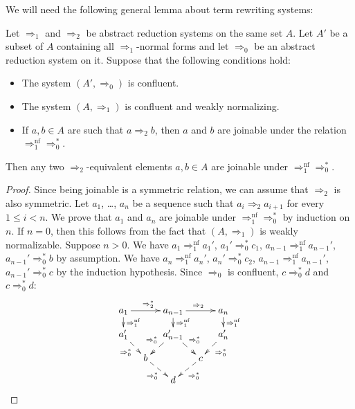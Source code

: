 \documentclass[reqno]{amsart}
\theoremstyle{definition}
\theoremstyle{remark}
\newcommand{\nf}{\mathrm{nf}}
\numberwithin{figure}{section}
\begin{document}
We will need the following general lemma about term rewriting systems:

\begin{lem}[conf-nf]
Let $\Rightarrow_1$ and $\Rightarrow_2$ be abstract reduction systems on the same set $A$.
Let $A'$ be a subset of $A$ containing all $\Rightarrow_1$-normal forms and let $\Rightarrow_0$ be an abstract reduction system on it.
Suppose that the following conditions hold:
\begin{itemize}
\item The system $(A',\Rightarrow_0)$ is confluent.
\item The system $(A,\Rightarrow_1)$ is confluent and weakly normalizing.
\item If $a,b \in A$ are such that $a \Rightarrow_2 b$, then $a$ and $b$ are joinable under the relation $\Rightarrow_1^\nf \Rightarrow_0^*$.
\end{itemize}
Then any two $\Rightarrow_2$-equivalent elements $a,b \in A$ are joinable under $\Rightarrow_1^\nf \Rightarrow_0^*$.
\end{lem}
\begin{proof}
Since being joinable is a symmetric relation, we can assume that $\Rightarrow_2$ is also symmetric.
Let $a_1$, \ldots, $a_n$ be a sequence such that $a_i \Rightarrow_2 a_{i+1}$ for every $1 \leq i < n$.
We prove that $a_1$ and $a_n$ are joinable under $\Rightarrow_1^\nf \Rightarrow_0^*$ by induction on $n$.
If $n = 0$, then this follows from the fact that $(A,\Rightarrow_1)$ is weakly normalizable.
Suppose $n > 0$.
We have $a_1 \Rightarrow_1^\nf a_1'$, $a_1' \Rightarrow_0^* c_1$, $a_{n-1} \Rightarrow_1^\nf a_{n-1}'$, $a_{n-1}' \Rightarrow_0^* b$ by assumption.
We have $a_n \Rightarrow_1^\nf a_n'$, $a_n' \Rightarrow_0^* c_2$, $a_{n-1} \Rightarrow_1^\nf a_{n-1}'$, $a_{n-1}' \Rightarrow_0^* c$ by the induction hypothesis.
Since $\Rightarrow_0$ is confluent, $c \Rightarrow_0^* d$ and $c \Rightarrow_0^* d$:
\[ \xymatrix@=1em{  a_1 \ar[rr]^{\Rightarrow_2^*} \ar@{-->}[d]^{\Rightarrow_1^\nf}  &                                   & a_{n-1} \ar[rr]^{\Rightarrow_2} \ar@{-->}[d]^{\Rightarrow_1^\nf}          &                                   & a_n \ar@{-->}[d]^{\Rightarrow_1^\nf}  \\
                    a_1' \ar@{-->}[rd]_{\Rightarrow_0^*}                            &                                   & a_{n-1}' \ar@{-->}[ld]_{\Rightarrow_0^*} \ar@{-->}[rd]^{\Rightarrow_0^*}  &                                   & a_n' \ar@{-->}[ld]^{\Rightarrow_0^*}  \\
                                                                                    & b \ar@{-->}[rd]_{\Rightarrow_0^*} &                                                                           & c \ar@{-->}[ld]^{\Rightarrow_0^*} &                                       \\
                                                                                    &                                   & d                                                                         &                                   &
                 } \]
\end{proof}
\end{document}
